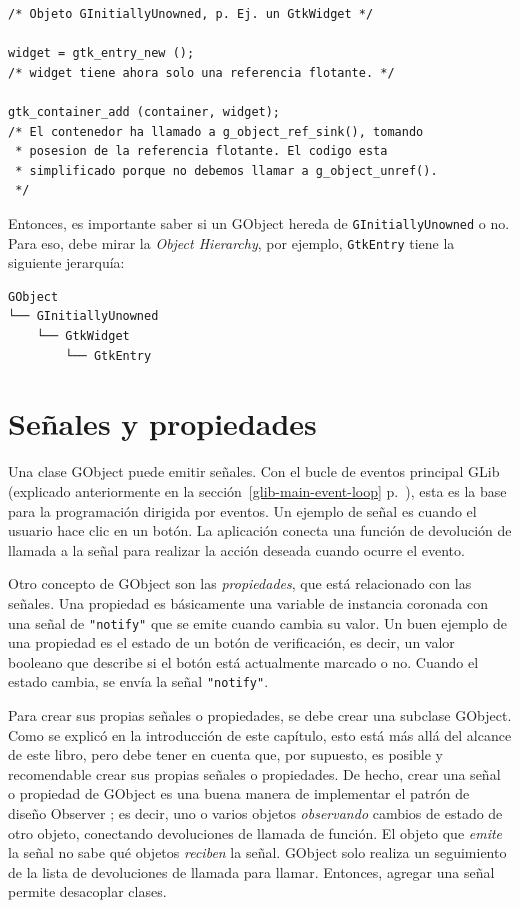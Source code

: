 \begin{lstlisting}[style=GLib/GTK, caption={Gestión de memoria de GObjects derivados de \lstinline{GInitiallyUnowned}.}, label=oop-gobject-mem-management-floating]
/* Objeto GInitiallyUnowned, p. Ej. un GtkWidget */

widget = gtk_entry_new ();
/* widget tiene ahora solo una referencia flotante. */

gtk_container_add (container, widget);
/* El contenedor ha llamado a g_object_ref_sink(), tomando
 * posesion de la referencia flotante. El codigo esta
 * simplificado porque no debemos llamar a g_object_unref().
 */
\end{lstlisting}

Entonces, es importante saber si un GObject hereda de \lstinline{GInitiallyUnowned} o no. Para eso, debe mirar la \emph{Object Hierarchy}, por ejemplo, \lstinline{GtkEntry} tiene la siguiente jerarquía:

\begin{verbatim}
GObject
└── GInitiallyUnowned
    └── GtkWidget
        └── GtkEntry
\end{verbatim}

\section{Señales y propiedades}
\label{oop-gobject-signals-and-properties}

Una clase GObject puede emitir señales. Con el bucle de eventos principal GLib (explicado anteriormente en la sección~\ref{glib-main-event-loop} p.~\pageref{glib-main-event-loop}), esta es la base para la programación dirigida por eventos. Un ejemplo de señal es cuando el usuario hace clic en un botón. La aplicación conecta una función de devolución de llamada a la señal para realizar la acción deseada cuando ocurre el evento.

Otro concepto de GObject son las \emph{propiedades}, que está relacionado con las señales. Una propiedad es básicamente una variable de instancia coronada con una señal de \lstinline{"notify"} que se emite cuando cambia su valor. Un buen ejemplo de una propiedad es el estado de un botón de verificación, es decir, un valor booleano que describe si el botón está actualmente marcado o no. Cuando el estado cambia, se envía la señal \lstinline{"notify"}.

Para crear sus propias señales o propiedades, se debe crear una subclase GObject. Como se explicó en la introducción de este capítulo, esto está más allá del alcance de este libro, pero debe tener en cuenta que, por supuesto, es posible y recomendable crear sus propias señales o propiedades. De hecho, crear una señal o propiedad de GObject es una buena manera de implementar el patrón de diseño Observer \cite{design-patterns-book}; es decir, uno o varios objetos \emph{observando} cambios de estado de otro objeto, conectando devoluciones de llamada de función. El objeto que \emph{emite} la señal no sabe qué objetos \emph{reciben} la señal. GObject solo realiza un seguimiento de la lista de devoluciones de llamada para llamar. Entonces, agregar una señal permite desacoplar clases.

